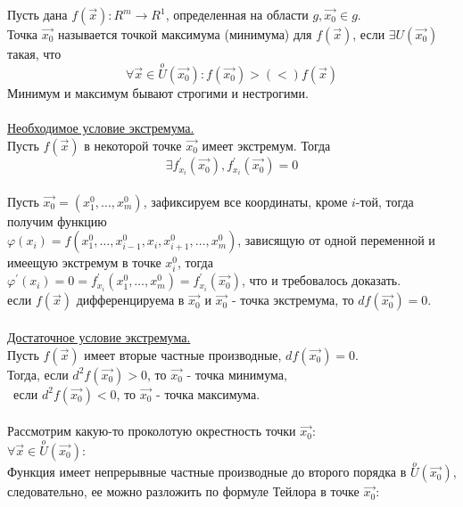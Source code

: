 \documentclass[12pt]{article}
\begin{document}
Пусть дана $f(\overrightarrow{x}) : R^m\to R^1$, определенная на области $g, \overrightarrow{x_0} \in g$.\\
Точка $\overrightarrow{x_0}$ называется точкой максимума (минимума) для $f(\overrightarrow{x})$, если $\exists U(\overrightarrow{x_0})$ такая, что\\
$$\forall \overrightarrow{x} \in \overset{o}{U}(\overrightarrow{x_0}) : f(\overrightarrow{x_0}) >(<) f(\overrightarrow{x})$$
Минимум и максимум бывают строгими и нестрогими.\\
\\
\label{question17_2}\uline{Необходимое условие экстремума.}\\
Пусть $f(\overrightarrow{x})$ в некоторой точке $\overrightarrow{x_0}$ имеет экстремум. Тогда\\
$$\exists f_{x_i}^{'}(\overrightarrow{x_0}), f_{x_i}^{'}(\overrightarrow{x_0})=0$$
\\
Пусть $\overrightarrow{x_0} = (x_1^0, \dots, x_m^0)$, зафиксируем все координаты, кроме $i$-той, тогда получим функцию\\
$\varphi(x_i) = f(x_1^0,\dots,x_{i-1}^0, x_i,x_{i+1}^0,\dots,x_m^0)$, зависящую от одной переменной и имеещую экстремум в точке $x_i^0$, тогда\\
$\varphi^{'}(x_i) = 0 = f^{'}_{x_i}(x_1^0,\dots,x_m^0) = f^{'}_{x_i}(\overrightarrow{x_0})$, что и требовалось доказать.\\
 если $f(\overrightarrow{x})$ дифференцируема в $\overrightarrow{x_0}$ и $\overrightarrow{x_0}$ - точка экстремума, то $df(\overrightarrow{x_0})=0$.\\
\\
\label{question17_3}\uline{Достаточное условие экстремума.}\\
Пусть $f(\overrightarrow{x})$ имеет вторые частные производные, $df(\overrightarrow{x_0}) = 0$.\\
Тогда, если $d^2 f(\overrightarrow{x_0})>0$, то $\overrightarrow{x_0}$ - точка минимума,\\
\indent \indent \ если $d^2 f(\overrightarrow{x_0})<0$, то $\overrightarrow{x_0}$ - точка максимума.\\
\\
Рассмотрим какую-то проколотую окрестность точки $\overrightarrow{x_0}$:\\
$\forall \overrightarrow{x} \in \overset{o}{U}(\overrightarrow{x_0})$:\\
Функция имеет непрерывные частные производные до второго порядка в $\overset{o}{U}(\overrightarrow{x_0})$, следовательно, ее можно разложить по формуле Тейлора в точке $\overrightarrow{x_0}$:\\
\end{document}
